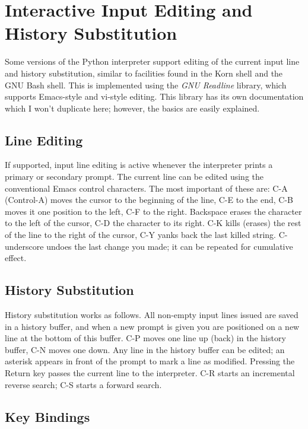 \documentclass{manual}
\begin{document}
\appendix

\chapter{Interactive Input Editing and History Substitution}
\label{interacting}

Some versions of the Python interpreter support editing of the current
input line and history substitution, similar to facilities found in
the Korn shell and the GNU Bash shell.  This is implemented using the
\emph{GNU Readline} library, which supports Emacs-style and vi-style
editing.  This library has its own documentation which I won't
duplicate here; however, the basics are easily explained.

\section{Line Editing}
\label{lineEditing}

If supported, input line editing is active whenever the interpreter
prints a primary or secondary prompt.  The current line can be edited
using the conventional Emacs control characters.  The most important
of these are: C-A (Control-A) moves the cursor to the beginning of the
line, C-E to the end, C-B moves it one position to the left, C-F to
the right.  Backspace erases the character to the left of the cursor,
C-D the character to its right.  C-K kills (erases) the rest of the
line to the right of the cursor, C-Y yanks back the last killed
string.  C-underscore undoes the last change you made; it can be
repeated for cumulative effect.

\section{History Substitution}
\label{history}

History substitution works as follows.  All non-empty input lines
issued are saved in a history buffer, and when a new prompt is given
you are positioned on a new line at the bottom of this buffer.  C-P
moves one line up (back) in the history buffer, C-N moves one down.
Any line in the history buffer can be edited; an asterisk appears in
front of the prompt to mark a line as modified.  Pressing the Return
key passes the current line to the interpreter.  C-R starts an
incremental reverse search; C-S starts a forward search.

\section{Key Bindings}
\label{keyBindings}
\end{document}
